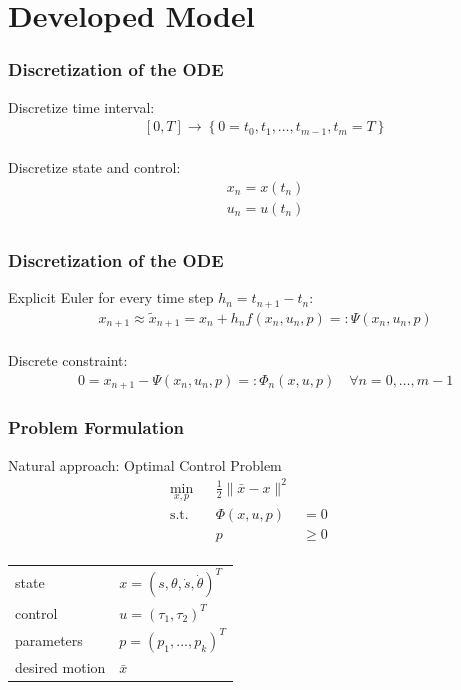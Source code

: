 \documentclass{beamer}
\begin{document}
\section{Developed Model}

\begin{frame}
    \frametitle{Discretization of the ODE}

    Discretize time interval:
    \begin{align*}
        &[0,T] \rightarrow \left\{ 0=t_0, t_1, \dots, t_{m-1}, t_{m}=T 
        \right\} \\
    \end{align*}

    Discretize state and control:
    \begin{align*}
        &x_n = x(t_n) \\
        &u_n = u(t_n) \\
    \end{align*}
\end{frame}

\begin{frame}
    \frametitle{Discretization of the ODE}

    Explicit Euler for every time step $h_n=t_{n+1}-t_n$:
    \begin{align*}
        &x_{n+1} \approx \tilde{x}_{n+1} = x_n + h_n f(x_n,u_n,p) =: \Psi(x_n,u_n,p) \\
    \end{align*}

    Discrete constraint:
    \begin{align*}
        &0 = x_{n+1} - \Psi(x_n,u_n,p) =: \Phi_n(x,u,p) \quad \forall n = 0,\ldots,m-1
    \end{align*}
\end{frame}



\begin{frame}
    \frametitle{Problem Formulation}
    Natural approach: Optimal Control Problem
    \begin{align*}
        \min_{x,p} & & \frac{1}{2} \| \bar{x} - x \|^2 & & \\
        \operatorname{s.t.} & & \Phi(x,u,p) & = 0 & & \\
                            & & p & \geq 0 & & \\
    \end{align*}

    \begin{tabular}{ll}
        state & $ x = (s,\theta,\dot{s},\dot{\theta})^T $ \\
        control & $ u = (\tau_1,\tau_2)^T $ \\
        parameters & $ p = (p_1,...,p_k)^T $ \\
        desired motion & $\bar{x}$ \\
    \end{tabular}
\end{frame}
\end{document}

